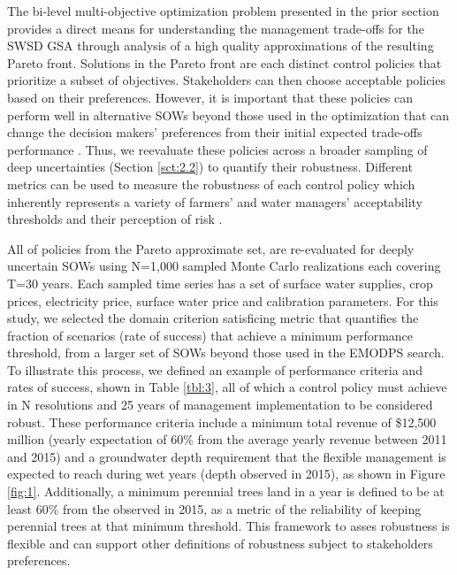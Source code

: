 \documentclass[a4paper,fleqn]{cas-sc}
\begin{document}
The bi-level multi-objective optimization problem presented in the prior section provides a direct means for understanding the management trade-offs for the SWSD GSA through analysis of a high quality approximations of the resulting Pareto front. Solutions in the Pareto front are each distinct control policies that prioritize a subset of objectives. Stakeholders can then choose acceptable policies based on their preferences. However, it is important that these policies can perform well in alternative SOWs beyond those used in the optimization that can change the decision makers' preferences from their initial expected trade-offs performance \citep{herman_how_2015}. Thus, we reevaluate these policies across a broader sampling of deep uncertainties (Section \ref{sct:2.2}) to quantify their robustness. Different metrics can be used to measure the robustness of each control policy which inherently represents a variety of farmers’ and water managers’ acceptability thresholds and their perception of risk \citep{mcphail_robustness_2018}. 

All of policies from the Pareto approximate set, are re-evaluated for deeply uncertain SOWs using   N=1,000 sampled Monte Carlo realizations each covering T=30 years. Each sampled time series has a set of surface water supplies, crop prices, electricity price, surface water price and calibration parameters. For this study, we selected the domain criterion satisficing metric \citep{schneller_decision_1983} that quantifies the fraction of scenarios (rate of success) that achieve a minimum performance threshold, from a larger set of SOWs beyond those used in the EMODPS search. To illustrate this process, we defined an example of performance criteria and rates of success, shown in Table \ref{tbl:3}, all of which a control policy must achieve in N resolutions and 25 years of management implementation to be considered robust. These performance criteria include a minimum total revenue of \$12,500 million (yearly expectation of 60\% from the average yearly revenue between 2011 and 2015) and a groundwater depth requirement that the flexible management is expected to reach during wet years (depth observed in 2015), as shown in Figure \ref{fig:1}. Additionally, a minimum perennial trees land in a year is defined to be at least 60\% from the observed in 2015, as a metric of the reliability of keeping perennial trees at that minimum threshold. This framework to asses robustness is flexible and can support other definitions of robustness subject to stakeholders preferences.
\end{document}
